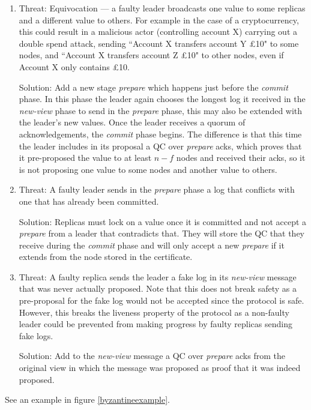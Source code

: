 \begin{enumerate}
\item Threat: Equivocation --- a faulty leader broadcasts one value to some replicas and a different value to others. For example in the case of a cryptocurrency, this could result in a malicious actor (controlling account X) carrying out a double spend attack, sending ``Account X transfers account Y £10" to some nodes, and ``Account X transfers account Z £10" to other nodes, even if Account X only contains £10.

Solution: Add a new stage \textit{prepare} which happens just before the \textit{commit} phase. In this phase the leader again chooses the longest log it received in the \textit{new-view} phase to send in the \textit{prepare} phase, this may also be extended with the leader's new values. Once the leader receives a quorum of acknowledgements, the \textit{commit} phase begins. The difference is that this time the leader includes in its proposal a QC over \textit{prepare} acks, which proves that it pre-proposed the value to at least $n - f$ nodes and received their acks, so it is not proposing one value to some nodes and another value to others.

\item Threat: A faulty leader sends in the \textit{prepare} phase a log that conflicts with one that has already been committed.

Solution: Replicas must lock on a value once it is committed and not accept a \textit{prepare} from a leader that contradicts that. They will store the QC that they receive during the \textit{commit} phase and will only accept a new \textit{prepare} if it extends from the node stored in the certificate.

\item Threat: A faulty replica sends the leader a fake log in its \textit{new-view} message that was never actually proposed. Note that this does not break safety as a pre-proposal for the fake log would not be accepted since the protocol is safe. However, this breaks the liveness property of the protocol as a non-faulty leader could be prevented from making progress by faulty replicas sending fake logs.

Solution: Add to the \textit{new-view} message a QC over \textit{prepare} acks from the original view in which the message was proposed as proof that it was indeed proposed.
\end{enumerate}

See an example in figure \ref{byzantineexample}.

